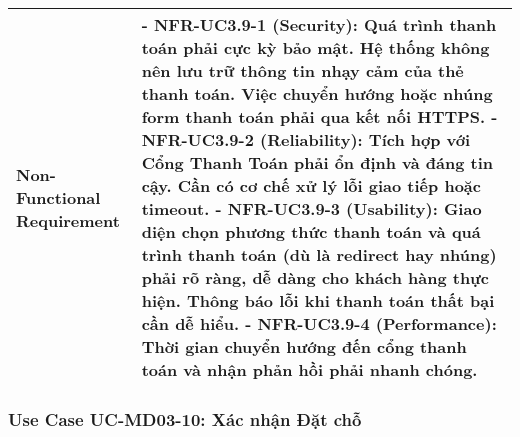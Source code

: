 \begin{longtable}{|m{4cm}|p{11cm}|}
\hline
Non-Functional Requirement & - \textbf{NFR-UC3.9-1 (Security):} Quá trình thanh toán phải cực kỳ bảo mật. Hệ thống không nên lưu trữ thông tin nhạy cảm của thẻ thanh toán. Việc chuyển hướng hoặc nhúng form thanh toán phải qua kết nối HTTPS. \newline - \textbf{NFR-UC3.9-2 (Reliability):} Tích hợp với Cổng Thanh Toán phải ổn định và đáng tin cậy. Cần có cơ chế xử lý lỗi giao tiếp hoặc timeout. \newline - \textbf{NFR-UC3.9-3 (Usability):} Giao diện chọn phương thức thanh toán và quá trình thanh toán (dù là redirect hay nhúng) phải rõ ràng, dễ dàng cho khách hàng thực hiện. Thông báo lỗi khi thanh toán thất bại cần dễ hiểu. \newline - \textbf{NFR-UC3.9-4 (Performance):} Thời gian chuyển hướng đến cổng thanh toán và nhận phản hồi phải nhanh chóng. \\
\hline
\end{longtable}

\subsubsection{Use Case UC-MD03-10: Xác nhận Đặt chỗ}


